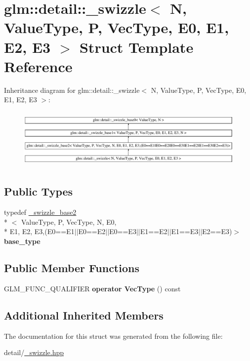 \hypertarget{structglm_1_1detail_1_1__swizzle}{\section{glm\-:\-:detail\-:\-:\-\_\-swizzle$<$ N, Value\-Type, P, Vec\-Type, E0, E1, E2, E3 $>$ Struct Template Reference}
\label{structglm_1_1detail_1_1__swizzle}
}
Inheritance diagram for glm\-:\-:detail\-:\-:\-\_\-swizzle$<$ N, Value\-Type, P, Vec\-Type, E0, E1, E2, E3 $>$\-:\begin{figure}[H]
\begin{center}
\leavevmode
\includegraphics[height=3.002681cm]{structglm_1_1detail_1_1__swizzle}
\end{center}
\end{figure}
\subsection*{Public Types}
\begin{DoxyCompactItemize}
\item 
\hypertarget{structglm_1_1detail_1_1__swizzle_acf7dfa9d7456eb833c247473c5a045f4}{typedef \hyperlink{structglm_1_1detail_1_1__swizzle__base2}{\-\_\-swizzle\-\_\-base2}\\*
$<$ Value\-Type, P, Vec\-Type, N, E0, \\*
E1, E2, E3,(E0==E1$\vert$$\vert$E0==E2$\vert$$\vert$E0==E3$\vert$$\vert$E1==E2$\vert$$\vert$E1==E3$\vert$$\vert$E2==E3)$>$ {\bfseries base\-\_\-type}}\label{structglm_1_1detail_1_1__swizzle_acf7dfa9d7456eb833c247473c5a045f4}

\end{DoxyCompactItemize}
\subsection*{Public Member Functions}
\begin{DoxyCompactItemize}
\item 
\hypertarget{structglm_1_1detail_1_1__swizzle_a333cdd33d2fb442775cca23c77e63fca}{G\-L\-M\-\_\-\-F\-U\-N\-C\-\_\-\-Q\-U\-A\-L\-I\-F\-I\-E\-R {\bfseries operator Vec\-Type} () const }\label{structglm_1_1detail_1_1__swizzle_a333cdd33d2fb442775cca23c77e63fca}

\end{DoxyCompactItemize}
\subsection*{Additional Inherited Members}


The documentation for this struct was generated from the following file\-:\begin{DoxyCompactItemize}
\item 
detail/\hyperlink{__swizzle_8hpp}{\-\_\-swizzle.\-hpp}\end{DoxyCompactItemize}
